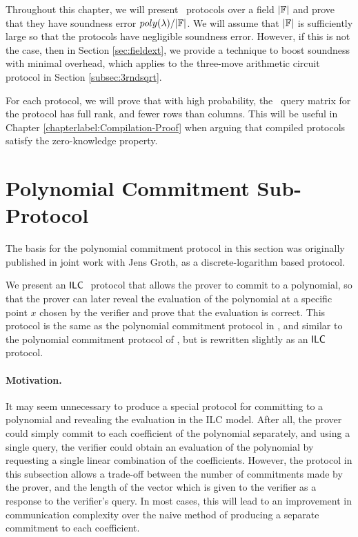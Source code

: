 Throughout this chapter, we will present \ILC \ protocols over a field $|\mathbb{F}|$ and prove that they have soundness error $poly(\lambda) / |\mathbb{F}|$. We will assume that $|\mathbb{F}|$ is sufficiently large so that the protocols have negligible soundness error. However, if this is not the case, then in Section \ref{sec:fieldext}, we provide a technique to boost soundness with minimal overhead, which applies to the three-move arithmetic circuit protocol in Section \ref{subsec:3rndsqrt}.

For each protocol, we will prove that with high probability, the \ILC\ query matrix for the protocol has full rank, and fewer rows than columns. This will be useful in Chapter \ref{chapterlabel:Compilation-Proof} when arguing that compiled protocols satisfy the zero-knowledge property.

\section{Polynomial Commitment Sub-Protocol} \label{subsec:polycommit}

The basis for the polynomial commitment protocol in this section was originally published in joint work \cite{BootleG18} with Jens Groth, as a discrete-logarithm based protocol.

We present an $\mathsf{ILC}~$ protocol that allows the prover to commit to a polynomial, so that the prover can later reveal the evaluation of the polynomial at a specific point $x$ chosen by the verifier and prove that the evaluation is correct. This protocol is the same as the polynomial commitment protocol in \cite{BootleG18}, and similar to the polynomial commitment protocol of \cite{BootleCCGP16}, but is rewritten slightly as an $\mathsf{ILC}~$ protocol.

\paragraph{Motivation.} It may seem unnecessary to produce a special protocol for committing to a polynomial and revealing the evaluation in the ILC model. After all, the prover could simply commit to each coefficient of the polynomial separately, and using a single query, the verifier could obtain an evaluation of the polynomial by requesting a single linear combination of the coefficients. However, the protocol in this subsection allows a trade-off between the number of commitments made by the prover, and the length of the vector which is given to the verifier as a response to the verifier's query. In most cases, this will lead to an improvement in communication complexity over the naive method of producing a separate commitment to each coefficient.

